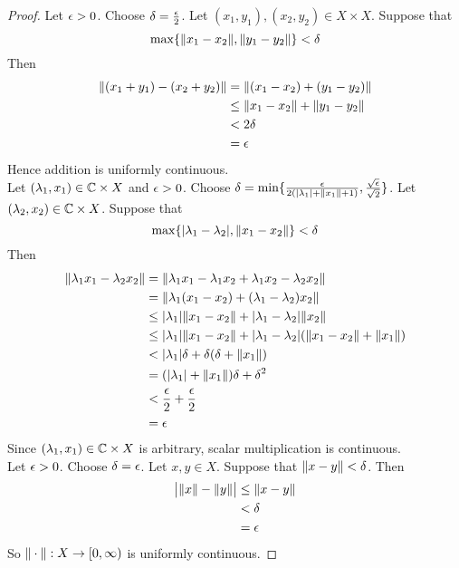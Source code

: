 \documentclass{book}
\begin{document}
	\begin{proof}
		Let $\epsilon > 0$. Choose $\delta = \frac{\epsilon}{2}$. Let $(x_1,y_1), (x_2,y_2) \in X \times X$. Suppose that 
		$$\max\{\|x_1-x_2 \|, \|y_1 - y_2 \|\} < \delta$$
		Then 
		\begin{align*}
			\|(x_1 + y_1) - (x_2+y_2) \|
			&= \|(x_1-x_2) + (y_1-y_2) \|\\
			& \leq \| x_1-x_2 \|+ \|y_1-y_2 \|\\
			& < 2\delta \\
			&= \epsilon
		\end{align*} 
		Hence addition is uniformly continuous. \vspace{1cm}\\ Let $(\lambda_1,x_1) \in \mathbb{C} \times X$ and $\epsilon >0$. Choose $\delta = \min\{\frac{\epsilon}{2(\vert \lambda_1 \vert + \|x_1 \|+ 1)}, \frac{\sqrt{\epsilon}}{\sqrt{2}}\}$. Let $(\lambda_2, x_2) \in \mathbb{C} \times X$. Suppose that $$ \max\{\vert \lambda_1-\lambda_2 \vert , \|x_1 - x_2 \|\} < \delta$$ 
		Then 
		\begin{align*}
			\|\lambda_1x_1 - \lambda_2x_2 \|
			&= \|\lambda_1x_1 - \lambda_1x_2 + \lambda_1x_2- \lambda_2x_2 \|\\
			&= \|\lambda_1(x_1-x_2) + (\lambda_1-\lambda_2)x_2 \|\\
			& \leq \vert \lambda_1 \vert \| x_1-x_2 \|+ \vert \lambda_1-\lambda_2 \vert \|x_2\|\\
			& \leq \vert \lambda_1 \vert  \| x_1-x_2 \|+ \vert \lambda_1-\lambda_2 \vert (\|x_1 -x_2\|+ \|x_1\|)\\
			& < \vert \lambda_1 \vert \delta  +  \delta( \delta + \|x_1 \|)\\
			&= (\vert \lambda_1 \vert + \|x_1 \|) \delta + \delta^2 \\
			&< \frac{\epsilon}{2}+ \frac{\epsilon}{2}\\
			&= \epsilon
		\end{align*}
		Since $(\lambda_1, x_1) \in \mathbb{C} \times X$ is arbitrary, scalar multiplication is continuous. \vspace{1cm} \\ Let $\epsilon > 0$. Choose $\delta = \epsilon$. Let $x,y \in X$. Suppose that $\|x-y \|< \delta$. Then 
		\begin{align*}
			\big \vert \|x \|- \|y \|\big  \vert
			& \leq \|x - y \|\\
			&< \delta\\
			&=\epsilon
		\end{align*}  
		So $\|\cdot \|: X \rightarrow [0,\infty)$ is uniformly continuous.
	\end{proof}
	
	
	
\end{document}

